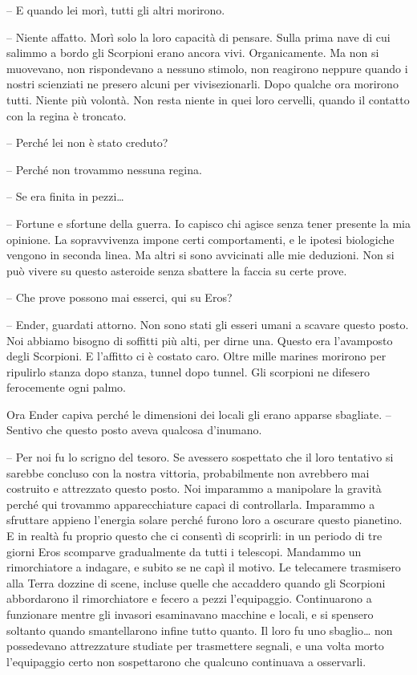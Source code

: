 {-- E quando lei morì, tutti gli altri morirono.}

{-- Niente affatto. Morì solo la loro capacità di pensare. Sulla prima
	nave di cui salimmo a bordo gli Scorpioni erano ancora vivi.
	Organicamente. Ma non si muovevano, non rispondevano a nessuno stimolo,
	non reagirono neppure quando i nostri scienziati ne presero alcuni per
	vivisezionarli. Dopo qualche ora morirono tutti. Niente più volontà. Non
	resta niente in quei loro cervelli, quando il contatto con la regina è
	troncato.}

{-- Perché lei non è stato creduto?}

{-- Perché non trovammo nessuna regina.}

{-- Se era finita in pezzi\ldots{}}

{-- Fortune e sfortune della guerra. Io capisco chi agisce senza tener
	presente la mia opinione. La sopravvivenza impone certi comportamenti, e
	le ipotesi biologiche vengono in seconda linea. Ma altri si sono
	avvicinati alle mie deduzioni. Non si può vivere su questo asteroide
	senza sbattere la faccia su certe prove.}

{-- Che prove possono mai esserci, qui su Eros?}

{-- Ender, guardati attorno. Non sono stati gli esseri umani a scavare
	questo posto. Noi abbiamo bisogno di soffitti più alti, per dirne una.
	Questo era l'avamposto degli Scorpioni. E l'affitto ci è costato caro.
	Oltre mille marines morirono per ripulirlo stanza dopo stanza, tunnel
	dopo tunnel. Gli scorpioni ne difesero ferocemente ogni palmo.}

{Ora Ender capiva perché le dimensioni dei locali gli erano apparse
	sbagliate. -- Sentivo che questo posto aveva qualcosa d'inumano.}

{-- Per noi fu lo scrigno del tesoro. Se avessero sospettato che il loro
	tentativo si sarebbe concluso con la nostra vittoria, probabilmente non
	avrebbero mai costruito e attrezzato questo posto. Noi imparammo a
	manipolare la gravità perché qui trovammo apparecchiature capaci di
	controllarla. Imparammo a sfruttare appieno l'energia solare perché
	furono loro a oscurare questo pianetino. E in realtà fu proprio questo
	che ci consentì di scoprirli: in un periodo di tre giorni Eros scomparve
	gradualmente da tutti i telescopi. Mandammo un rimorchiatore a indagare,
	e subito se ne capì il motivo. Le telecamere trasmisero alla Terra
	dozzine di scene, incluse quelle che accaddero quando gli Scorpioni
	abbordarono il rimorchiatore e fecero a pezzi l'equipaggio. Continuarono
	a funzionare mentre gli invasori esaminavano macchine e locali, e si
	spensero soltanto quando smantellarono infine tutto quanto. Il loro fu
	uno sbaglio\ldots{} non possedevano attrezzature studiate per
	trasmettere segnali, e una volta morto l'equipaggio certo non
	sospettarono che qualcuno continuava a osservarli.}

